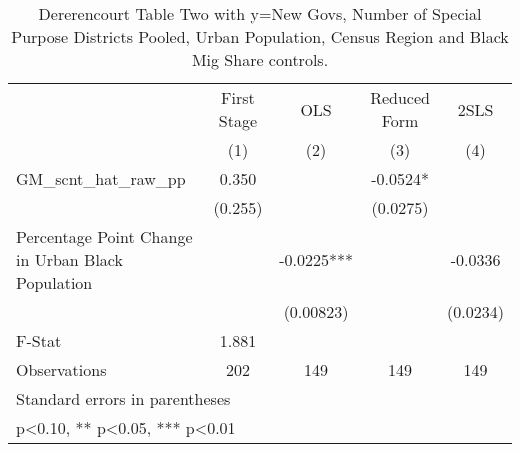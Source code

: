 \begin{table}[htbp]\centering
\def\sym#1{\ifmmode^{#1}\else\(^{#1}\)\fi}
\caption{Dererencourt Table Two with y=New Govs, Number of Special Purpose Districts Pooled, Urban Population, Census Region and Black Mig Share controls.}
\begin{tabular}{l*{4}{c}}
\toprule
                    & First Stage   &         OLS   &Reduced Form   &        2SLS   \\
                    &\multicolumn{1}{c}{(1)}   &\multicolumn{1}{c}{(2)}   &\multicolumn{1}{c}{(3)}   &\multicolumn{1}{c}{(4)}   \\
\midrule
GM\_scnt\_hat\_raw\_pp  &       0.350   &               &     -0.0524*  &               \\
                    &     (0.255)   &               &    (0.0275)   &               \\
\addlinespace
Percentage Point Change in Urban Black Population&               &     -0.0225***&               &     -0.0336   \\
                    &               &   (0.00823)   &               &    (0.0234)   \\
\midrule
F-Stat              &       1.881   &               &               &               \\
Observations        &         202   &         149   &         149   &         149   \\
\bottomrule
\multicolumn{5}{l}{\footnotesize Standard errors in parentheses}\\
\multicolumn{5}{l}{\footnotesize * p<0.10, ** p<0.05, *** p<0.01}\\
\end{tabular}
\end{table}
